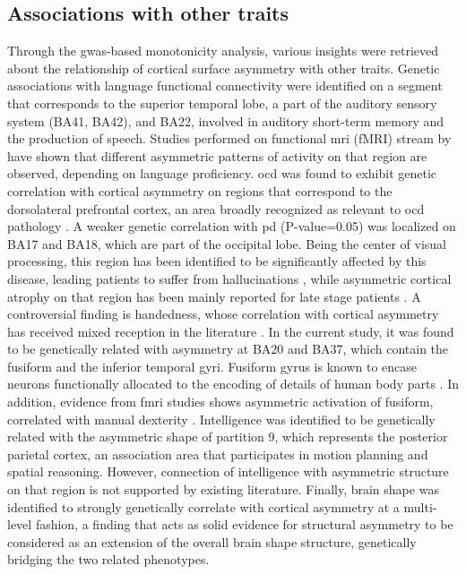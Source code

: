 \subsection{Associations with other traits}
Through the \ac{gwas}-based monotonicity analysis, various insights were retrieved about the relationship of cortical surface asymmetry with other traits. Genetic associations with language functional connectivity  were identified on a segment that corresponds to the superior temporal lobe, a part of the auditory sensory system (BA41, BA42), and BA22, involved in auditory short-term memory and the production of speech. Studies performed on functional \ac{mri} (fMRI) stream by \citet{Hesling2012} have shown that different asymmetric patterns of activity on that region are observed, depending on language proficiency.  \Ac{ocd} was found to exhibit genetic correlation with cortical asymmetry on regions  that correspond to the dorsolateral prefrontal cortex, an area broadly recognized as relevant to \ac{ocd} pathology \cite{Li2020,Han2016}. A weaker genetic correlation with \ac{pd} (P-value=0.05) was localized on BA17 and BA18, which are part of the occipital lobe. Being the center of visual processing, this region has been identified to be significantly affected by this disease, leading patients to suffer from hallucinations \cite{Weil2016}, while asymmetric cortical atrophy on that region has been mainly reported for late stage patients \cite{Claassen2016}. A controversial finding is handedness, whose correlation with cortical asymmetry has received mixed reception in the literature \cite{Sun2006, Kong2021}. In the current study, it was found to be genetically related with asymmetry at BA20 and BA37, which contain the fusiform and the inferior temporal gyri. Fusiform gyrus is known to encase neurons functionally allocated to the encoding of details of human body parts \cite{Peelen2005}. In addition, evidence from f\ac{mri} studies shows asymmetric activation of fusiform, correlated with manual dexterity \cite{Bracci2010}. Intelligence was identified to be genetically related with the asymmetric shape of partition 9, which represents the posterior parietal cortex, an association area that participates in motion planning and spatial reasoning. However, connection of intelligence with asymmetric structure on that region is not supported by existing literature. Finally, brain shape \cite{Naqvi2021} was identified to strongly genetically correlate with cortical asymmetry at a multi-level fashion, a finding that acts as solid evidence  for structural asymmetry to be considered as an extension of the overall brain shape structure, genetically bridging the two related phenotypes.

